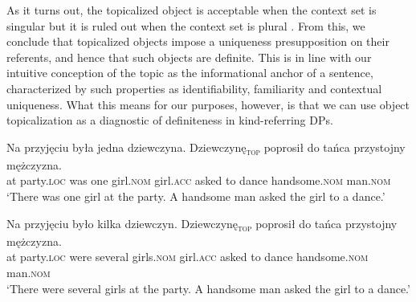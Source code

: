\documentclass[output=paper]{langscibook}
\begin{document}
As it turns out, the topicalized object is acceptable when the context set is singular  but it is ruled out when the context set is plural . From this, we conclude that topicalized objects impose a uniqueness presupposition on their referents, and hence that such objects are definite. This is in line with our intuitive conception of the topic as the informational anchor of a sentence, characterized by such properties as identifiability, familiarity and contextual uniqueness. What this means for our purposes, however, is that we can use object topicalization as a diagnostic of definiteness in kind-referring DPs.

\ea \label{ex:party}
\ea \gll
Na przyjęciu była jedna dziewczyna. Dziewczynę\textsubscript{\textsc{top}} poprosił do tańca przystojny mężczyzna.\\
at party.\textsc{loc} was one girl.\textsc{nom} girl.\textsc{acc} asked to dance handsome.\textsc{nom} man.\textsc{nom}\\

\glt `There was one girl at the party. A handsome man asked the girl to a dance.' \label{ex:party_1}

\ex \gll
Na przyjęciu było kilka dziewczyn. \minsp{\#} Dziewczynę\textsubscript{\textsc{top}} poprosił do tańca przystojny mężczyzna.\\
at party.\textsc{loc} were several girls.\textsc{nom} {} girl.\textsc{acc} asked to dance handsome.\textsc{nom} man.\textsc{nom}\\

\glt `There were several girls at the party. A handsome man asked the girl to a dance.' \label{ex:party_2}
\z \z
\end{document}
